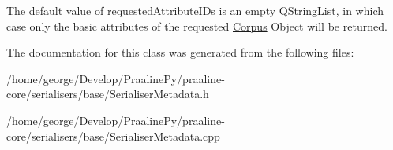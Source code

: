 The default value of requested\+Attribute\+I\+Ds is an empty Q\+String\+List, in which case only the basic attributes of the requested \hyperlink{class_corpus}{Corpus} Object will be returned. 

The documentation for this class was generated from the following files\+:\begin{DoxyCompactItemize}
\item 
/home/george/\+Develop/\+Praaline\+Py/praaline-\/core/serialisers/base/Serialiser\+Metadata.\+h\item 
/home/george/\+Develop/\+Praaline\+Py/praaline-\/core/serialisers/base/Serialiser\+Metadata.\+cpp\end{DoxyCompactItemize}
